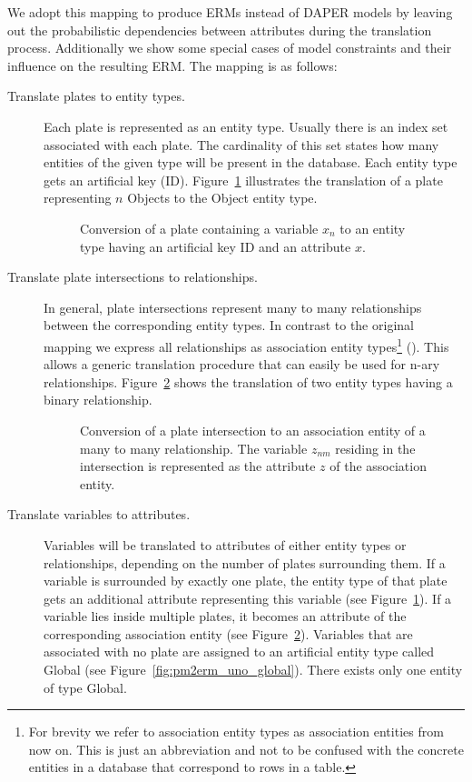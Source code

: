 We adopt this mapping to produce ERMs instead of DAPER models by leaving out the probabilistic dependencies between attributes during the translation process. Additionally we show some special cases of model constraints and their influence on the resulting ERM. The mapping is as follows:

\begin{description}
\item[Translate plates to entity types.] Each plate is represented as an entity type. Usually there is an index set associated with each plate. The cardinality of this set states how many entities of the given type will be present in the database. Each entity type gets an artificial key (ID). Figure~\ref{fig:pm2erm_uno_local} illustrates the translation of a plate representing $n$ Objects to the Object entity type.

\begin{figure}[t]
\centering
\scalebox{\tikzScale}{\adjustTikzSize }
\caption{Conversion of a plate containing a variable $x_n$ to an entity type having an artificial key ID and an attribute $x$.}\label{fig:pm2erm_uno_local}
\end{figure}

\item[Translate plate intersections to relationships.] In general, plate intersections represent many to many relationships between the corresponding entity types. In contrast to the original mapping we express all relationships as association entity types\footnote{For brevity we refer to association entity types as association entities from now on. This is just an abbreviation and not to be confused with the concrete entities in a database that correspond to rows in a table.} (\cite[p.~86-88]{elmasri2007database}). This allows a generic translation procedure that can easily be used for n-ary relationships. Figure~\ref{fig:pm2erm_bi_noconstraints} shows the translation of two entity types having a binary relationship.

\begin{figure}[t]
\centering
\scalebox{\tikzScale}{\adjustTikzSize }
\caption{Conversion of a plate intersection to an association entity of a many to many relationship. The variable $z_{nm}$ residing in the intersection is represented as the attribute $z$ of the association entity.}\label{fig:pm2erm_bi_noconstraints}
\end{figure}

\item[Translate variables to attributes.] Variables will be translated to attributes of either entity types or relationships, depending on the number of plates surrounding them. If a variable is surrounded by exactly one plate, the entity type of that plate gets an additional attribute representing this variable (see Figure~\ref{fig:pm2erm_uno_local}). If a variable lies inside multiple plates, it becomes an attribute of the corresponding association entity (see Figure~\ref{fig:pm2erm_bi_noconstraints}). Variables that are associated with no plate are assigned to an artificial entity type called Global (see Figure~\ref{fig:pm2erm_uno_global}). There exists only one entity of type Global.


\end{description}
